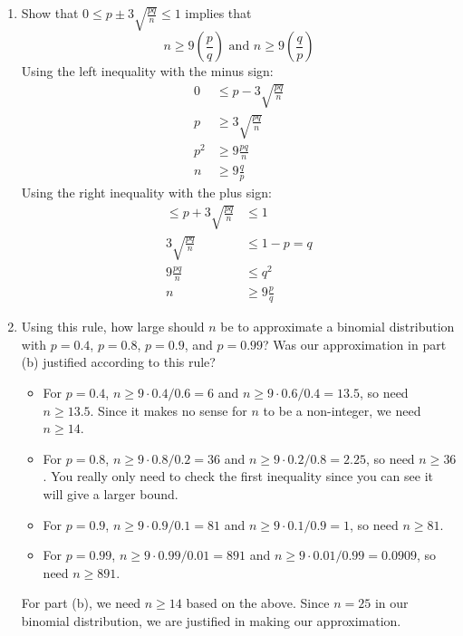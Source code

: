 \documentclass[12pt]{article}
\begin{document}
\begin{enumerate}
\begin{enumerate}
\item Show that $0 \leq p \pm 3 \sqrt{\frac{pq}{n}} \leq 1$ implies that
\[
n \geq 9\left( \frac{p}{q} \right) \text{ and } n \geq 9\left( \frac{q}{p} \right)
\]
Using the left inequality with the minus sign:
\begin{align*}
0 &\leq p - 3 \sqrt{\frac{pq}{n}}\\
p &\geq 3 \sqrt{\frac{pq}{n}}\\
p^2 &\geq 9 \frac{pq}{n} \\
n &\geq 9 \frac{q}{p}
\end{align*}
Using the right inequality with the plus sign:
\begin{align*}
\leq p + 3 \sqrt{\frac{pq}{n}} &\leq 1 \\
3 \sqrt{\frac{pq}{n}} &\leq 1 - p = q \\
9 \frac{pq}{n} &\leq q^2 \\
n &\geq 9 \frac{p}{q}
\end{align*}

\item Using this rule, how large should $n$ be to approximate a binomial distribution with $p = 0.4$, $p = 0.8$, $p = 0.9$, and $p = 0.99$? Was our approximation in part (b) justified according to this rule?\\

\begin{itemize}[noitemsep]
\item For $p = 0.4$, $n \geq 9 \cdot 0.4/0.6 = 6$ and $n \geq 9 \cdot 0.6/0.4 = 13.5$, so need $n \geq 13.5$. Since it makes no sense for $n$ to be a non-integer, we need $n \geq 14$.
\item For $p = 0.8$, $n \geq 9 \cdot 0.8/0.2 = 36$ and $n \geq 9 \cdot 0.2/0.8 = 2.25$, so need $n \geq 36$. You really only need to check the first inequality since you can see it will give a larger bound.
\item For $p = 0.9$, $n \geq 9 \cdot 0.9/0.1 = 81$ and $n \geq 9 \cdot 0.1/0.9 = 1$, so need $n \geq 81$.
\item For $p = 0.99$, $n \geq 9 \cdot 0.99/0.01 = 891$ and $n \geq 9 \cdot 0.01/0.99 = 0.0909$, so need $n \geq 891$.
\end{itemize}
For part (b), we need $n \geq 14$ based on the above. Since $n = 25$ in our binomial distribution, we are justified in making our approximation.
\end{enumerate}

\end{enumerate}
\end{document}
